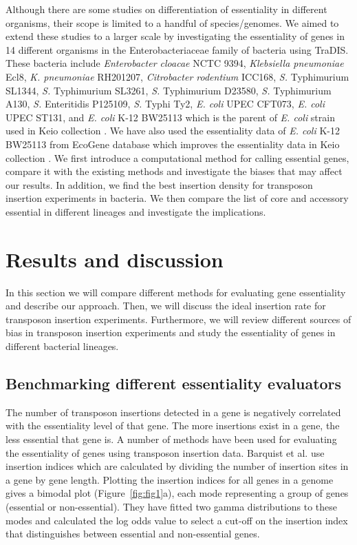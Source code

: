 \documentclass[12pt,letterpaper]{article}
\begin{document}
Although there are some studies on differentiation of essentiality in different organisms, their scope is limited to a handful of species/genomes. We aimed to extend these studies to a larger scale by investigating the essentiality of genes in 14 different organisms in the Enterobacteriaceae family of bacteria using TraDIS. These bacteria include \textit{Enterobacter cloacae} NCTC 9394, \textit{Klebsiella pneumoniae} Ecl8, \textit{K. pneumoniae} RH201207, \textit{Citrobacter rodentium} ICC168, \textit{S.} Typhimurium SL1344, \textit{S.} Typhimurium SL3261, \textit{S.} Typhimurium D23580, \textit{S.} Typhimurium A130, \textit{S.} Enteritidis P125109, \textit{S.} Typhi Ty2, \textit{E. coli} UPEC CFT073, \textit{E. coli} UPEC ST131, and \textit{E. coli} K-12 BW25113 which is the parent of \textit{E. coli} strain used in Keio collection \cite{baba_construction_2006}. We have also used the essentiality data of \textit{E. coli} K-12 BW25113 from EcoGene database \cite{zhou_ecogene_2013} which improves the essentiality data in Keio collection \cite{baba_construction_2006}. We first introduce a computational method for calling essential genes, compare it with the existing methods and investigate the biases that may affect our results. In addition, we find the best insertion density for transposon insertion experiments in bacteria. We then compare the list of core and accessory essential in different lineages and investigate the implications. %
\section{Results and discussion}
In this section we will compare different methods for evaluating gene essentiality and describe our approach. Then, we will discuss the ideal insertion rate for transposon insertion experiments. Furthermore, we will review different sources of bias in transposon insertion experiments and study the essentiality of genes in different bacterial lineages.
\subsection{Benchmarking different essentiality evaluators}
The number of transposon insertions detected in a gene is negatively correlated with the essentiality level of that gene. The more insertions exist in a gene, the less essential that gene is. A number of methods have been used for evaluating the essentiality of genes using transposon insertion data. Barquist et al. \cite{barquist_tradis_2016} use insertion indices which are calculated by dividing the number of insertion sites in a gene by gene length. Plotting the insertion indices for all genes in a genome gives a bimodal plot (Figure~\ref{fig:fig1}a), each mode representing a group of genes (essential or non-essential). They have fitted two gamma distributions to these modes and calculated the log odds value to select a cut-off on the insertion index that distinguishes between essential and non-essential genes.
\end{document}
